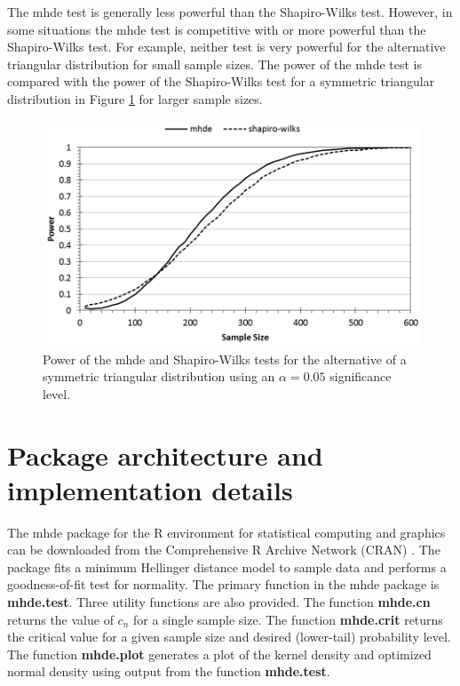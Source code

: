 \documentclass{article}
\begin{document}
The mhde test is generally less powerful than the Shapiro-Wilks test.  However, in some situations the mhde test is competitive with or more powerful than the Shapiro-Wilks test.  For example, neither test is very powerful for the alternative triangular distribution for small sample sizes.  The power of the mhde test is compared with the power of the Shapiro-Wilks test for a symmetric triangular distribution in Figure \ref{fig:power} for larger sample sizes.

\begin{figure}[h!]
\centering
\includegraphics[scale=1.0]{power.png}
\caption{Power of the mhde and Shapiro-Wilks tests for the alternative of a symmetric triangular distribution using an $\alpha=0.05$ significance level.}
\label{fig:power}
\end{figure}

\section{Package architecture and implementation details}

The mhde package for the R environment for statistical computing and graphics \parencite{rcore2015} can be downloaded from the Comprehensive R Archive Network (CRAN) \parencite{cran}.  The package fits a minimum Hellinger distance model to sample data and performs a goodness-of-fit test for normality. The primary function in the mhde package is \textbf{mhde.test}. Three utility functions are also provided.  The function \textbf{mhde.cn} returns the value of $c_n$ for a single sample size.  The function \textbf{mhde.crit} returns the critical value for a given sample size and desired (lower-tail) probability level.  The function \textbf{mhde.plot} generates a plot of the kernel density and optimized normal density using output from the function \textbf{mhde.test}.
\end{document}
